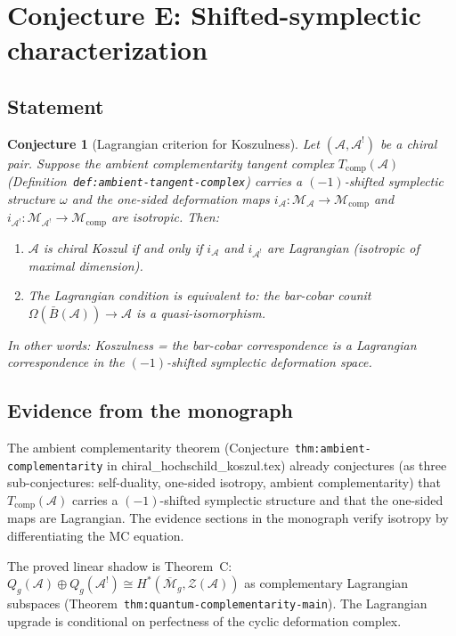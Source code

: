 \documentclass[11pt]{article}
\newcommand{\cA}{\mathcal{A}}
\newcommand{\cZ}{\mathcal{Z}}
\newcommand{\barB}{\bar{B}}
\theoremstyle{plain}
\newtheorem{conjecture}{Conjecture}[section]
\theoremstyle{definition}
\theoremstyle{remark}
\begin{document}
\section{Conjecture E: Shifted-symplectic characterization}
\label{sec:shifted-symplectic}

\subsection{Statement}

\begin{conjecture}[Lagrangian criterion for Koszulness]
\label{conj:lagrangian}
Let $(\cA, \cA^!)$ be a chiral pair.  Suppose the ambient
complementarity tangent complex $T_{\mathrm{comp}}(\cA)$
(Definition~\texttt{def:ambient-tangent-complex}) carries a
$(-1)$-shifted symplectic structure $\omega$ and the one-sided
deformation maps
$i_\cA \colon \mathcal{M}_\cA \to \mathcal{M}_{\mathrm{comp}}$
and
$i_{\cA^!} \colon \mathcal{M}_{\cA^!} \to \mathcal{M}_{\mathrm{comp}}$
are isotropic.  Then:
\begin{enumerate}[label=(\roman*)]
\item $\cA$ is chiral Koszul if and only if $i_\cA$ and
  $i_{\cA^!}$ are \emph{Lagrangian} (isotropic of maximal
  dimension).
\item The Lagrangian condition is equivalent to: the bar-cobar
  counit $\Omega(\barB(\cA)) \to \cA$ is a quasi-isomorphism.
\end{enumerate}
In other words: \emph{Koszulness = the bar-cobar correspondence
is a Lagrangian correspondence in the $(-1)$-shifted symplectic
deformation space.}
\end{conjecture}

\subsection{Evidence from the monograph}

The ambient complementarity theorem
(Conjecture~\texttt{thm:ambient-complementarity} in
chiral\_hochschild\_koszul.tex) already conjectures (as three
sub-conjectures: self-duality, one-sided isotropy, ambient
complementarity) that $T_{\mathrm{comp}}(\cA)$ carries a
$(-1)$-shifted symplectic structure and that the one-sided maps
are Lagrangian.  The evidence sections in the monograph verify
isotropy by differentiating the MC equation.

The proved linear shadow is Theorem~C: $Q_g(\cA) \oplus Q_g(\cA^!)
\cong H^*(\overline{\mathcal{M}}_g, \cZ(\cA))$ as complementary
Lagrangian subspaces
(Theorem~\texttt{thm:quantum-complementarity-main}).  The
Lagrangian upgrade is conditional on perfectness of the cyclic
deformation complex.
\end{document}
